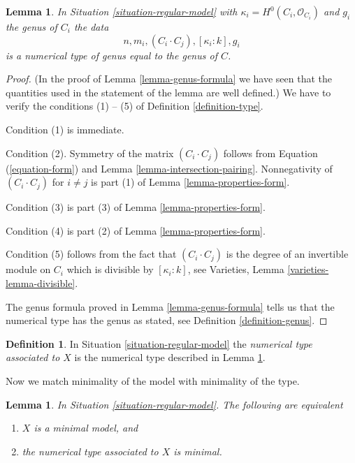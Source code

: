 \documentclass[10pt,a4paper]{amsart}
\theoremstyle{plain}
\newtheorem{lemma}[subsection]{Lemma}
\theoremstyle{definition}
\newtheorem{definition}[subsection]{Definition}
\theoremstyle{remark}
\numberwithin{equation}{subsection}
\begin{document}
\begin{lemma}
\label{lemma-numerical-type-of-model}
In Situation \ref{situation-regular-model} with
$\kappa_i = H^0(C_i, \mathcal{O}_{C_i})$ and $g_i$ the genus of $C_i$
the data
$$
n, m_i, (C_i \cdot C_j), [\kappa_i : k], g_i
$$
is a numerical type of genus equal to the genus of $C$.
\end{lemma}

\begin{proof}
(In the proof of Lemma \ref{lemma-genus-formula}
we have seen that the quantities
used in the statement of the lemma are well defined.)
We have to verify the conditions (1) -- (5) of
Definition \ref{definition-type}.

\medskip\noindent
Condition (1) is immediate.

\medskip\noindent
Condition (2). Symmetry of the matrix $(C_i \cdot C_j)$ follows from
Equation (\ref{equation-form}) and
Lemma \ref{lemma-intersection-pairing}.
Nonnegativity of $(C_i \cdot C_j)$ for $i \not = j$
is part (1) of Lemma \ref{lemma-properties-form}.

\medskip\noindent
Condition (3) is part (3) of Lemma \ref{lemma-properties-form}.

\medskip\noindent
Condition (4) is part (2) of Lemma \ref{lemma-properties-form}.

\medskip\noindent
Condition (5) follows from the fact that $(C_i \cdot C_j)$ is
the degree of an invertible module on $C_i$ which is divisible
by $[\kappa_i : k]$, see Varieties, Lemma \ref{varieties-lemma-divisible}.

\medskip\noindent
The genus formula proved in Lemma \ref{lemma-genus-formula}
tells us that the numerical type has the genus as stated, see
Definition \ref{definition-genus}.
\end{proof}

\begin{definition}
\label{definition-numerical-type-model}
In Situation \ref{situation-regular-model} the
{\it numerical type associated to $X$} is the numerical
type described in Lemma \ref{lemma-numerical-type-of-model}.
\end{definition}

\noindent
Now we match minimality of the model with minimality of the type.

\begin{lemma}
\label{lemma-numerical-type-minimal-model}
In Situation \ref{situation-regular-model}. The following
are equivalent
\begin{enumerate}
\item $X$ is a minimal model, and
\item the numerical type associated to $X$ is minimal.
\end{enumerate}
\end{lemma}
\end{document}
